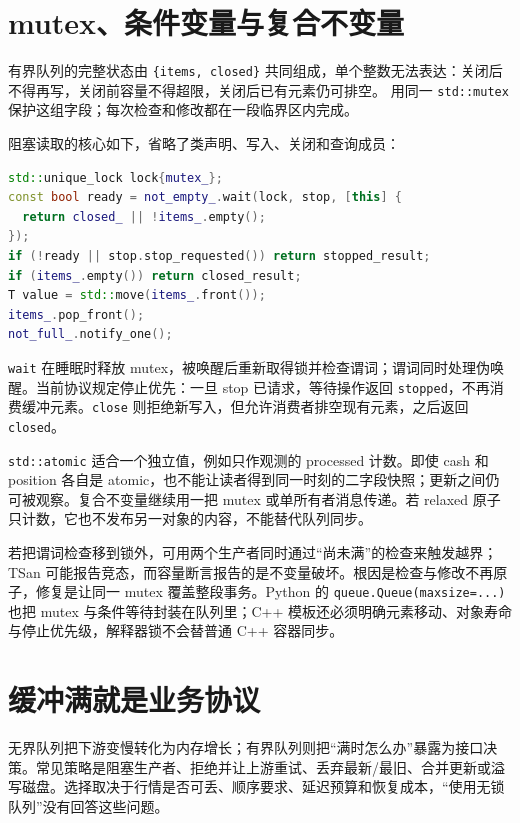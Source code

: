 \section{mutex、条件变量与复合不变量}

有界队列的完整状态由 \texttt{\{items, closed\}} 共同组成，单个整数无法表达：关闭后不得再写，关闭前容量不得超限，关闭后已有元素仍可排空。 用同一 \texttt{std::mutex} 保护这组字段；每次检查和修改都在一段临界区内完成。

阻塞读取的核心如下，省略了类声明、写入、关闭和查询成员：

\begin{lstlisting}[language=C++,numbers=none]
std::unique_lock lock{mutex_};
const bool ready = not_empty_.wait(lock, stop, [this] {
  return closed_ || !items_.empty();
});
if (!ready || stop.stop_requested()) return stopped_result;
if (items_.empty()) return closed_result;
T value = std::move(items_.front());
items_.pop_front();
not_full_.notify_one();
\end{lstlisting}

\texttt{wait} 在睡眠时释放 mutex，被唤醒后重新取得锁并检查谓词；谓词同时处理伪唤醒。当前协议规定停止优先：一旦 stop 已请求，等待操作返回 \texttt{stopped}，不再消费缓冲元素。\texttt{close} 则拒绝新写入，但允许消费者排空现有元素，之后返回 \texttt{closed}。

\texttt{std::atomic} 适合一个独立值，例如只作观测的 processed 计数。即使 cash 和 position 各自是 atomic，也不能让读者得到同一时刻的二字段快照；更新之间仍可被观察。复合不变量继续用一把 mutex 或单所有者消息传递。若 relaxed 原子只计数，它也不发布另一对象的内容，不能替代队列同步。

若把谓词检查移到锁外，可用两个生产者同时通过“尚未满”的检查来触发越界；TSan 可能报告竞态，而容量断言报告的是不变量破坏。根因是检查与修改不再原子，修复是让同一 mutex 覆盖整段事务。Python 的 \texttt{queue.Queue(maxsize=...)} 也把 mutex 与条件等待封装在队列里；C++ 模板还必须明确元素移动、对象寿命与停止优先级，解释器锁不会替普通 C++ 容器同步。

\section{缓冲满就是业务协议}

无界队列把下游变慢转化为内存增长；有界队列则把“满时怎么办”暴露为接口决策。常见策略是阻塞生产者、拒绝并让上游重试、丢弃最新/最旧、合并更新或溢写磁盘。选择取决于行情是否可丢、顺序要求、延迟预算和恢复成本，“使用无锁队列”没有回答这些问题。

